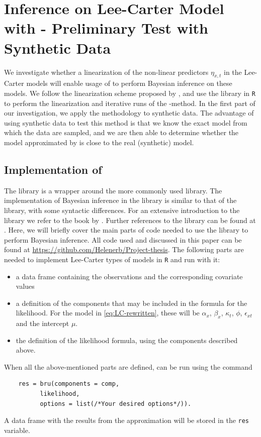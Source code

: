 \newpage
\section{Inference on Lee-Carter Model with \inlabru - Preliminary Test with Synthetic Data}
\label{sec:SyntheticData}
We investigate whether a linearization of the non-linear predictors $\eta_{x,t}$ in the Lee-Carter models will enable usage of \inla to perform Bayesian inference on these models. We follow the linearization scheme proposed by \textcite{BachlLindgren2019}, and use the \inlabru library in \texttt{R} to perform the linearization and iterative runs of the \inla-method. In the first part of our investigation, we apply the methodology to synthetic data. The advantage of using synthetic data to test this method is that we know the exact model from which the data are sampled, and we are then able to determine whether the model approximated by \inlabru is close to the real (synthetic) model. 

\subsection{Implementation of \inlabru}
\label{sec:implementationInlabru}
The \inlabru library is a wrapper around the more commonly used \rinla library. The implementation of Bayesian inference in the \inlabru library is similar to that of the \rinla library, with some syntactic differences. For an extensive introduction to the \rinla library we refer to the book by \textcite{Rubio2020}. Further references to the \inlabru library can be found at \textcite{Inlabru}. Here, we will briefly cover the main parts of code needed to use the \inlabru library to perform Bayesian inference. All code used and discussed in this paper can be found at \url{https://github.com/Helenerb/Project-thesis}. 
\newline
\noindent The following parts are needed to implement Lee-Carter types of models in \texttt{R} and run \inlabru with it:
\begin{itemize}
    \item a data frame containing the observations and the corresponding covariate values
    \item a definition of the components that may be included in the formula for the likelihood. For the model in \ref{eq:LC-rewritten}, these will be $\alpha_x$, $\beta_x$, $\kappa_t$, $\phi$, $\epsilon_{xt}$ and the intercept $\mu$.
    \item the definition of the likelihood formula, using the components described above.
\end{itemize}
When all the above-mentioned parts are defined, \inlabru can be run using the command 
\begin{verbatim}
    res = bru(components = comp,
          likelihood, 
          options = list(/*Your desired options*/)).
\end{verbatim}
A data frame with the results from the approximation will be stored in the \texttt{res} variable. 

